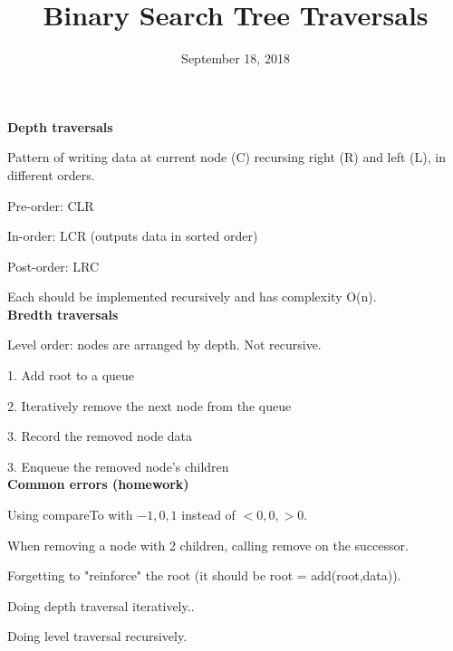 \documentclass{exam}
\title{Binary Search Tree Traversals}
\date{September 18, 2018}
\begin{document}
	
	\maketitle
	
	\textbf{Depth traversals}
	
	Pattern of writing data at current node (C) recursing right (R) and left (L), in different orders.
	
	Pre-order: CLR
	
	In-order: LCR (outputs data in sorted order)
	
	Post-order: LRC
	
	Each should be implemented recursively and has complexity O(n).\\
	
	\textbf{Bredth traversals}
	
	Level order: nodes are arranged by depth. Not recursive.
	
	1. Add root to a queue
	
	2. Iteratively remove the next node from the queue
	
	3. Record the removed node data
	
	3. Enqueue the removed node's children\\
	
	\textbf{Common errors (homework)}
	
	Using compareTo with $-1, 0, 1$ instead of $< 0, 0, >0$.
	
	When removing a node with 2 children, calling remove on the successor.
	
	Forgetting to "reinforce" the root (it should be root = add(root,data)).
	
	Doing depth traversal iteratively..
	
	Doing level traversal recursively.
	
\end{document}
